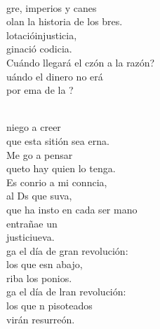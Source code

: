 \begin{cancion}%
	    \\
	gre, imperios y canes\\
	olan la historia de los bres.\\
	lotacióinjusticia,\\
	ginació codicia.\\
	Cuándo llegará el czón a la razón?\\
	uándo el dinero no erá \\
	por ema de la ? \\\jump\\
	\begin{chorus}%
	 niego a creer\\
	que esta sitión sea erna.\\
	Me go a pensar \\
	queto hay quien lo tenga.\\
	Es conrio a mi conncia,\\
	al Ds que suva,\\
	que ha insto en cada ser mano\\
	entrañae un\\
	justiciueva.   \\
\jump
	ga el día de gran revolución:\\
	los que esn abajo,  \\
	riba los ponios.\\
	ga el día de lran revolución:\\
	los que n pisoteados \\
	virán resurreón.\\
	\end{chorus}%

\end{cancion}

